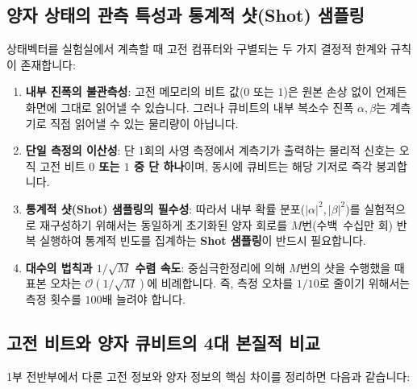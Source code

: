 \documentclass[11pt, a4paper]{article}
\theoremstyle{definition}
\begin{document}
\subsection{양자 상태의 관측 특성과 통계적 샷(Shot) 샘플링}
상태벡터를 실험실에서 계측할 때 고전 컴퓨터와 구별되는 두 가지 결정적 한계와 규칙이 존재합니다:
\begin{enumerate}
    \item \textbf{내부 진폭의 불관측성}: 고전 메모리의 비트 값($0$ 또는 $1$)은 원본 손상 없이 언제든 화면에 그대로 읽어낼 수 있습니다. 그러나 큐비트의 내부 복소수 진폭 $\alpha, \beta$는 계측기로 직접 읽어낼 수 있는 물리량이 아닙니다.
    \item \textbf{단일 측정의 이산성}: 단 1회의 사영 측정에서 계측기가 출력하는 물리적 신호는 오직 고전 비트 \textbf{$0$ 또는 $1$ 중 단 하나}이며, 동시에 큐비트는 해당 기저로 즉각 붕괴합니다.
    \item \textbf{통계적 샷(Shot) 샘플링의 필수성}: 따라서 내부 확률 분포($|\alpha|^2, |\beta|^2$)를 실험적으로 재구성하기 위해서는 동일하게 초기화된 양자 회로를 $M$번(수백~수십만 회) 반복 실행하여 통계적 빈도를 집계하는 \textbf{Shot 샘플링}이 반드시 필요합니다.
    \item \textbf{대수의 법칙과 $1/\sqrt{M}$ 수렴 속도}: 중심극한정리에 의해 $M$번의 샷을 수행했을 때 표본 오차는 $\mathcal{O}(1/\sqrt{M})$에 비례합니다. 즉, 측정 오차를 $1/10$로 줄이기 위해서는 측정 횟수를 $100$배 늘려야 합니다.
\end{enumerate}

\subsection{고전 비트와 양자 큐비트의 4대 본질적 비교}
1부 전반부에서 다룬 고전 정보와 양자 정보의 핵심 차이를 정리하면 다음과 같습니다:

\begin{table}[htbp]
\centering
{}
\end{table}
\end{document}
